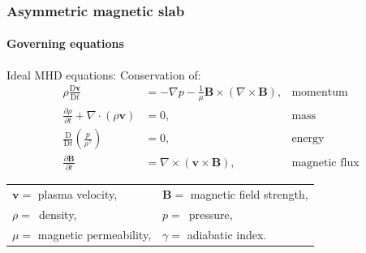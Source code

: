 \documentclass[table]{beamer}
\begin{document}
\begin{frame}
\frametitle{Asymmetric magnetic slab}
\framesubtitle{Governing equations}
Ideal MHD equations: \hspace{3.8cm} Conservation of:
\begin{align*}
\rho\frac{\textrm{D}\boldsymbol{v}}{\textrm{D}{t}}&=-\nabla{p}-\frac{1}{\mu}\boldsymbol{B}\times(\nabla\times\boldsymbol{B}), & \text{momentum} \\
\frac{\partial\rho}{\partial{t}}+\nabla\cdot(\rho\boldsymbol{v})&=0, & \text{mass} \\
\frac{\textrm{D}}{\textrm{D}{t}}\left(\frac{p}{\rho^\gamma}\right)&=0, & \text{energy} \\
\frac{\partial{\boldsymbol{B}}}{\partial{t}}&=\nabla\times(\boldsymbol{v}\times\boldsymbol{B}), & \text{magnetic flux} 
\end{align*}

\small
\centering
\vspace{0.7cm}
\begin{tabular}{ll}
$\boldsymbol{v}=$ plasma velocity, & $\boldsymbol{B}=$ magnetic field strength,
\\
$\rho=$~density, & $p=$~pressure,
\\
$\mu=$ magnetic permeability, & $\gamma=$ adiabatic index.
\end{tabular}
\end{frame}
\end{document}
